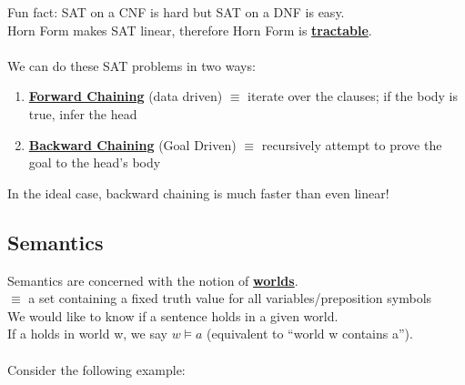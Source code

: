 \documentclass[../../lecture_notes.tex]{subfiles}
\begin{document}
\noindent Fun fact: SAT on a CNF is hard but SAT on a DNF is easy.\\
Horn Form makes SAT linear, therefore Horn Form is \textbf{\underline{tractable}}.\\
\\
We can do these SAT problems in two ways:
\begin{enumerate} [itemsep=0mm]
	\item \textbf{\underline{Forward Chaining}} (data driven) 
		$\equiv$ iterate over the clauses; if the body is true, infer the head
	\item \textbf{\underline{Backward Chaining}} (Goal Driven)
            $\equiv$ recursively attempt to prove the goal to the head’s body
\end{enumerate}
\noindent In the ideal case, backward chaining is much faster than even linear!


\subsection*{Semantics}
\noindent Semantics are concerned with the notion of \textbf{\underline{worlds}}.\\
 \indent $\equiv$ a set containing a fixed truth value for all variables/preposition symbols
\\
We would like to know if a sentence holds in a given world.\\
If a holds in world w, we say $w \models a$ (equivalent to “world w contains a”).\\
\\
Consider the following example:
\end{document}
